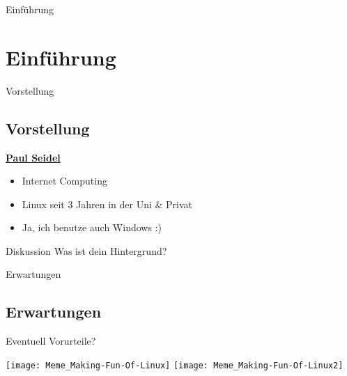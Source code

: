 
\begin{frame}{Einführung}
    \section{Einführung}\label{sec:einfuhrung}
\end{frame}

\begin{frame}{Vorstellung}
    \subsection{Vorstellung}\label{subsec:vorstellung}

    \underline{\textbf{Paul Seidel}}

    \begin{itemize}
        \item Internet Computing\pause
        \item Linux seit 3 Jahren in der Uni \& Privat\pause
        \item Ja, ich benutze auch Windows :)
    \end{itemize}

    \pause
    \vspace{0.5cm}
    \begin{alertblock}{Diskussion}
        Was ist dein Hintergrund?
    \end{alertblock}

\end{frame}
\begin{frame}{Erwartungen}
    \subsection{Erwartungen}\label{subsec:erwartungen}
    Eventuell Vorurteile?

        \texttt{[image: Meme\_Making-Fun-Of-Linux]}
    \endminipage\hfill
        \texttt{[image: Meme\_Making-Fun-Of-Linux2]}
    \endminipage\hfill
\end{frame}

